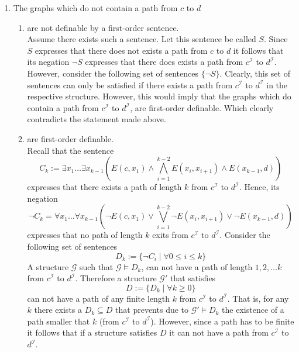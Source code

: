 \documentclass[11pt,a4paper]{article}
\begin{document}
\begin{enumerate}
\begin{enumerate}
\end{enumerate}

\item The graphs which do not contain a path from $c$ to $d$
\begin{enumerate}
\item are not definable by a first-order sentence. \\

Assume there exists such a sentence. Let this sentence be called $S$. Since $S$ expresses that there does not exists a path from $c$ to $d$ it follows that its negation $\neg S$ expresses that there does exists a path from $c^{\mathcal{I}}$ to $d^{\mathcal{I}}$. However, consider the following set of sentences $\{\neg S\}$. Clearly, this set of sentences can only be satisfied if there exists a path from $c^{\mathcal{I}}$ to $d^{\mathcal{I}}$ in the respective structure. However, this would imply that the graphs which do contain a path from $c^{\mathcal{I}}$ to $d^{\mathcal{I}}$, are first-order definable. Which clearly contradicts the statement made above.

\item are first-order definable.\\

Recall that the sentence
\begin{equation*}
C_k := \exists x_1  \dots \exists x_{k-1} \left(  E(c,x_1) \land \bigwedge_{i=1}^{k-2} E(x_i, x_{i+1}) \land E(x_{k-1}, d) \right) 
\end{equation*}
expresses that there exists a path of length $k$ from $c^{\mathcal{I}}$ to $d^{\mathcal{I}}$. Hence, its negation
\begin{equation*}
\neg C_k = \forall x_1  \dots \forall x_{k-1} \left(  \neg E(c,x_1) \lor \bigvee_{i=1}^{k-2} \neg E(x_i, x_{i+1}) \lor \neg E(x_{k-1}, d) \right) 
\end{equation*}
expresses that no path of length $k$ exits from $c^{\mathcal{I}}$ to $d^{\mathcal{I}}$. Consider the following set of sentences 
\begin{equation*}
D_k := \{\neg C_i \mid \forall 0 \leq i \leq k \}
\end{equation*}
A structure $\mathcal{G}$ such that $\mathcal{G} \models D_k$, can not have a path of length $1, 2, \dots k$ from $c^{\mathcal{I}}$ to $d^{\mathcal{I}}$. Therefore a structure $\mathcal{G}'$ that satisfies
\begin{equation*}
D :=  \{ D_k \mid \forall k \geq 0 \}
\end{equation*}
can not have a path of any finite length $k$ from $c^{\mathcal{I}}$ to $d^{\mathcal{I}}$. That is, for any $k$ there exists a $D_k \subseteq D$ that prevents due to $\mathcal{G}' \models D_k$ the existence of a path smaller that $k$ (from $c^{\mathcal{I}}$ to $d^{\mathcal{I}}$). However, since a path has to be finite it follows that if a structure satisfies $D$ it can not have a path from $c^{\mathcal{I}}$ to $d^{\mathcal{I}}$.\\


\end{enumerate}
\end{enumerate}
\end{document}
